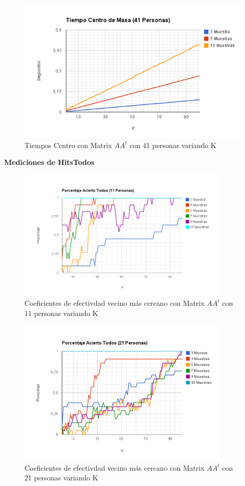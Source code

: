 \begin{figure}[H]
\includegraphics[width=1\textwidth]{img/imagei.png}
     \caption{Tiempos Centro con Matrix $AA^t$ con 41 personas variando K}
\end{figure}


\textbf{Mediciones de HitsTodos}

\begin{figure}[H]
\includegraphics[width=0.9\textwidth]{img/imagej.png}
     \caption{Coeficientes de efectivdad vecino más cercano con Matrix $AA^t$ con 11 personas variando K}
\end{figure}

\begin{figure}[H]
\includegraphics[width=0.9\textwidth]{img/imagek.png}
     \caption{Coeficientes de efectivdad vecino más cercano con Matrix $AA^t$ con 21 personas variando K}
\end{figure}

